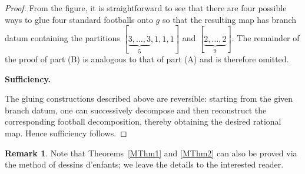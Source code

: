 \documentclass[microtype]{gtpart}     %
\theoremstyle{definition}
\newtheorem*{rem}{Remark}             %
\begin{document}
\begin{proof}
From the figure, it is straightforward to see that there are four possible ways to glue four standard footballs onto $g$ so that the resulting map has branch datum containing the partitions $[\underbrace{3,\ldots,3}_{5},1,1,1]$ and $[\underbrace{2,\ldots,2}_{9}]$. The remainder of the proof of part (B) is analogous to that of part (A) and is therefore omitted.

\textbf{Sufficiency.}

The gluing constructions described above are reversible: starting from the given branch datum, one can successively decompose and then reconstruct the corresponding football decomposition, thereby obtaining the desired rational map. Hence sufficiency follows.
\end{proof}


\begin{rem}
Note that Theorems~\ref{MThm1} and \ref{MThm2} can also be proved via the method of dessins d'enfants; we leave the details to the interested reader.
\end{rem}


\end{document}
